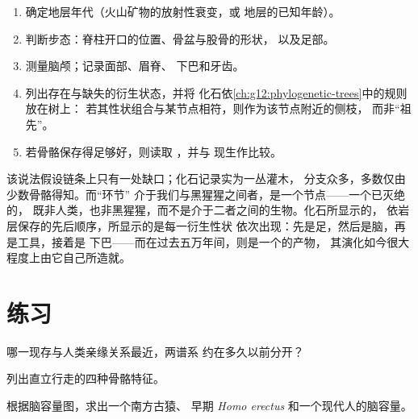 \begin{method}[化石的定位]\label{met:g12:human-evolution:placing}
\begin{enumerate}
  \item 确定地层年代（火山矿物的放射性衰变，或
        地层的已知年龄）。
  \item 判断步态：脊柱开口的位置、骨盆与股骨的形状，
        以及足部。
  \item 测量脑颅；记录面部、眉脊、
        下巴和牙齿。
  \item 列出存在与缺失的衍生状态，并将
        化石依\cref{ch:g12:phylogenetic-trees}中的规则放在树上：
        若其性状组合与某节点相符，则作为该节点附近的侧枝，
        而非“祖先”。
  \item 若骨骼保存得足够好，则读取 ，并与
        现生作比较。
\end{enumerate}
\end{method}

\begin{remark}\label{rem:g12:human-evolution:link}
该说法假设链条上只有一处缺口；化石记录实为一丛灌木，
分支众多，多数仅由少数骨骼得知。而“环节”
介于我们与黑猩猩之间者，是一个节点——一个已灭绝的，
既非人类，也非黑猩猩，而不是介于二者之间的生物。化石所显示的，
依岩层保存的先后顺序，所显示的是每一衍生性状
依次出现：先是足，然后是脑，再是工具，接着是
下巴——而在过去五万年间，则是一个的产物，
其演化如今很大程度上由它自己所造就。
\end{remark}

\section{练习}

\begin{exercise}[$\star$]\label{exo:g12:human-evolution:1}
哪一现存与人类亲缘关系最近，两谱系
约在多久以前分开？
\end{exercise}

\begin{exercise}[$\star$]\label{exo:g12:human-evolution:2}
列出直立行走的四种骨骼特征。
\end{exercise}

\begin{exercise}[$\star$]\label{exo:g12:human-evolution:3}
根据脑容量图，求出一个南方古猿、
早期 \emph{Homo erectus} 和一个现代人的脑容量。
\end{exercise}

